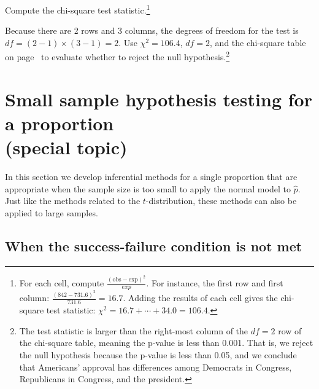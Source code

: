 \begin{exercise}
Compute the chi-square test statistic.\footnote{For each cell, compute $\frac{(\text{obs} - \text{exp})^2}{exp}$. For instance, the first row and first column: $\frac{(842-731.6)^2}{731.6} = 16.7$. Adding the results of each cell gives the chi-square test statistic: {\scriptsize$\chi^2 = 16.7 + \cdots + 34.0 = 106.4$}.}
\end{exercise}

\begin{exercise}
Because there are 2 rows and 3 columns, the degrees of freedom for the test is $df=(2-1)\times (3-1) = 2$. Use $\chi^2=106.4$, $df=2$, and the chi-square table on page~\pageref{chiSquareProbabilityTable} to evaluate whether to reject the null hypothesis.\footnote{The test statistic is larger than the right-most column of the $df=2$ row of the chi-square table, meaning the p-value is less than 0.001. That is, we reject the null hypothesis because the p-value is less than 0.05, and we conclude that Americans' approval has differences among Democrats in Congress, Republicans in Congress, and the president.}
\end{exercise}




\section[Small sample hypothesis testing for a proportion (special topic)]{Small sample hypothesis testing for a proportion\\(special topic)}
\label{smallSampleHTForProportion}

In this section we develop inferential methods for a single proportion that are appropriate when the sample size is too small to apply the normal model to $\hat{p}$. Just like the methods related to the $t$-distribution, these methods can also be applied to large samples.

\subsection{When the success-failure condition is not met}

